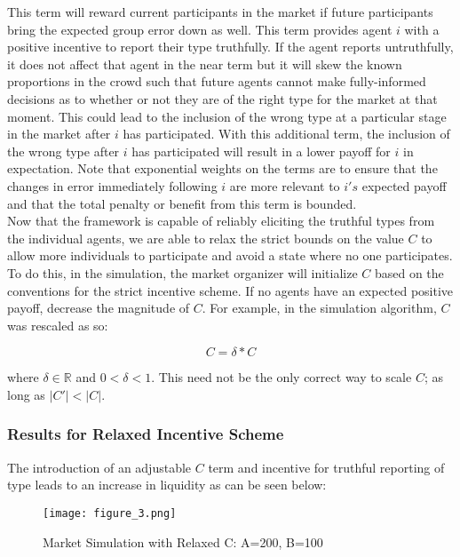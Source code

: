 \documentclass[twoside,twocolumn]{article}
\begin{document}
This term will reward current participants in the market if future participants bring the expected group error down as well. This term provides agent $i$ with a positive incentive to report their type truthfully. If the agent reports untruthfully, it does not affect that agent in the near term but it will skew the known proportions in the crowd such that future agents cannot make fully-informed decisions as to whether or not they are of the right type for the market at that moment. This could lead to the inclusion of the wrong type at a particular stage in the market after $i$ has participated. With this additional term, the inclusion of the wrong type after $i$ has participated will result in a lower payoff for $i$ in expectation. Note that exponential weights on the terms are to ensure that the changes in error immediately following $i$ are more relevant to $i's$ expected payoff and that the total penalty or benefit from this term is bounded.\\

Now that the framework is capable of reliably eliciting the truthful types from the individual agents, we are able to relax the strict bounds on the value $C$ to allow more individuals to participate and avoid a state where no one participates. To do this, in the simulation, the market organizer will initialize $C$ based on the conventions for the strict incentive scheme. If no agents have an expected positive payoff, decrease the magnitude of $C$. For example, in the simulation algorithm, $C$ was rescaled as so:

\begin{equation}
\label{Cscale}
C = \delta * C
\end{equation}

where $\delta \in \mathbb{R}$ and $0 < \delta < 1$. This need not be the only correct way to scale $C$; as long as $|C'| < |C|$.

\subsubsection{Results for Relaxed Incentive Scheme}

The introduction of an adjustable $C$ term and incentive for truthful reporting of type leads to an increase in liquidity as can be seen below:

\begin{figure}[h]
\centering
\texttt{[image: figure\_3.png]}
\caption{Market Simulation with Relaxed C: A=200, B=100}
\end{figure}
\end{document}
